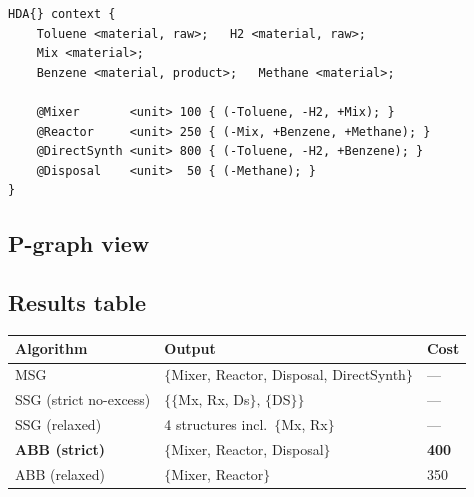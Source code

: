 \documentclass[11pt,a4paper]{article}
\begin{document}
\begin{lstlisting}
HDA{} context {
    Toluene <material, raw>;   H2 <material, raw>;
    Mix <material>;
    Benzene <material, product>;   Methane <material>;

    @Mixer       <unit> 100 { (-Toluene, -H2, +Mix); }
    @Reactor     <unit> 250 { (-Mix, +Benzene, +Methane); }
    @DirectSynth <unit> 800 { (-Toluene, -H2, +Benzene); }
    @Disposal    <unit>  50 { (-Methane); }
}
\end{lstlisting}

\subsection{P-graph view}

\begin{center}
\end{center}

\subsection{Results table}

\begin{center}\small
\begin{tabular}{lll}
\toprule
Algorithm                 & Output                                     & Cost \\
\midrule
MSG                       & $\{$Mixer, Reactor, Disposal, DirectSynth$\}$ & --- \\
SSG (strict no-excess)    & $\{\{$Mx, Rx, Ds$\},\,\{$DS$\}\}$           & --- \\
SSG (relaxed)             & 4 structures incl.\ $\{$Mx, Rx$\}$          & --- \\
\textbf{ABB (strict)}     & $\{$Mixer, Reactor, Disposal$\}$            & \textbf{400} \\
ABB (relaxed)             & $\{$Mixer, Reactor$\}$                      & 350 \\
\bottomrule
\end{tabular}
\end{center}
\end{document}
